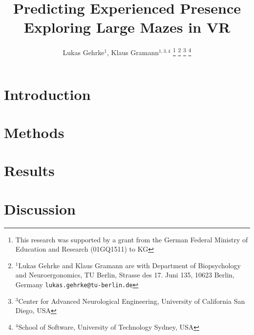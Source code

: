 \documentclass[letterpaper, 10 pt, conference]{ieeeconf}  %
\title{\LARGE \bf Predicting Experienced Presence Exploring Large Mazes in VR}
\author{Lukas Gehrke$^{1}$, Klaus Gramann$^{1,3,4}$%
\thanks{This research was supported by a grant from the German Federal Ministry of Education and Research (01GQ1511) to KG}%
\thanks{$^{1}$Lukas Gehrke and Klaus Gramann are with Department of Biopsychology and Neuroergonomics, TU Berlin, Strasse des 17. Juni 135, 10623 Berlin, Germany
        {\tt\small lukas.gehrke@tu-berlin.de}}%
\thanks{$^{3}$Center for Advanced Neurological Engineering, University of California San Diego, USA}
\thanks{$^{4}$School of Software, University of Technology Sydney, USA}
}
\begin{document}
\maketitle
\thispagestyle{empty}
\pagestyle{empty}

\begin{abstract}

\end{abstract}

\section{Introduction}


\section{Methods}


\section{Results}


\section{Discussion}


\addtolength{\textheight}{-12cm}   %



\end{document}
